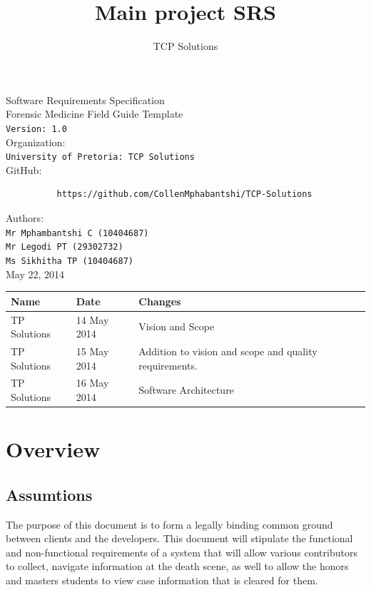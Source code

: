 \documentclass[10pt,a4paper]{article}
\author{TCP Solutions}
\title{Main project SRS}
\begin{document}
\begin{titlepage}
\begin{center}

\huge Software Requirements Specification\\[0.15cm]
\huge Forensic Medicine Field Guide Template\\[0.15cm]
\large \texttt{Version: 1.0}\\[1cm]

Organization:\\
\texttt{University of Pretoria: TCP Solutions}\\[0.5cm]
GitHub:\\[0.01cm]

\begin{verbatim}
          https://github.com/CollenMphabantshi/TCP-Solutions
\end{verbatim}

Authors:\\
\texttt{Mr Mphambantshi C (10404687)\\
        Mr Legodi PT (29302732)\\
        Ms Sikhitha TP  (10404687)}\\[1cm]
        
May 22, 2014

\begin{tabular}{|l|l|l|}\hline
Name   & Date	& Changes	\\\hline
TP Solutions	& 14 May 2014	& Vision and Scope\\\hline
TP Solutions	& 15 May 2014	& Addition to vision and scope and quality requirements.\\\hline
TP Solutions	& 16 May 2014	& Software Architecture\\\hline
\end{tabular}

\end{center}
\end{titlepage}


\tableofcontents
\pagebreak
\section{Overview}

\subsection{Assumtions}
The purpose of this document is to form a legally binding common ground between clients and the developers. This document will stipulate the functional and non-functional requirements of a system that will allow various contributors to collect, navigate information at the death scene, as well to allow the honors and masters students to view case information that is cleared for them.
\end{document}
